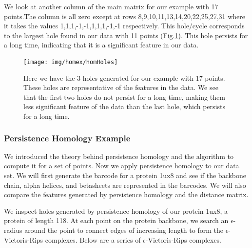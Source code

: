 \documentclass[12pt, a4paper, twocolumn, fullpage]{article}
\theoremstyle{plain}
\theoremstyle{definition}
\theoremstyle{remark}
\begin{document}
We look at another column of the main matrix for our example with 17 points.The column is all zero except at rows 8,9,10,11,13,14,20,22,25,27,31 where it takes the values 1,1,1,-1,-1,1,1,1,-1,-1 respectively. This hole/cycle corresponds to the largest hole found in our data with 11 points (Fig.\ref{homHoles}). This hole persists for a long time, indicating that it is a significant feature in our data.

\begin{figure}[t]
	\centering
    \texttt{[image: img/homex/homHoles]}
    \caption{Here we have the 3 holes generated for our example with 17 points. These holes are representative of the features in the data. We see that the first two holes do not persist for a long time, making them less significant feature of the data than the last hole, which persists for a long time.}
    \label{homHoles}
\end{figure}
\pagebreak

\subsubsection{Persistence Homology Example}

We introduced the theory behind persistence homology and the algorithm to compute it for a set of points. Now we apply persistence homology to our data set. We will first generate the barcode for a protein 1ux8 and see if the backbone chain, alpha helices, and betasheets are represented in the barcodes. We will also compare the features generated by persistence homology and the distance matrix.

We inspect holes generated by persistence homology of our protein 1ux8, a protein of length 118. At each point on the protein backbone, we search an $\epsilon$-radius around the point to connect edges of increasing length to form the $\epsilon$-Vietoris-Rips complexes. Below are a series of $\epsilon$-Vietoris-Rips complexes.
\end{document}
